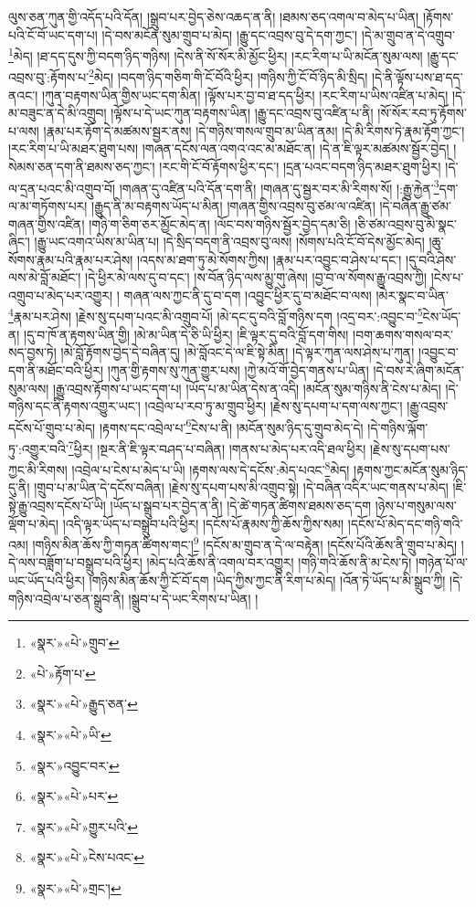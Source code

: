 ལུས་ཅན་ཀུན་གྱི་འདོད་པའི་དོན། །སྒྲུབ་པར་བྱེད་ཅེས་འཆད་ན་ནི། །ཐམས་ཅད་འགལ་བ་མེད་པ་ཡིན། །རྟོགས་པའི་ངོ་བོ་ཡང་དག་པ། །དེ་བས་མངོན་སུམ་གྲུབ་པ་མེད། །རྒྱུ་དང་འབྲས་བུ་དེ་དག་ཀྱང་། །དེ་མ་གྲུབ་ན་དེ་འགྲུབ་\footnote{«སྣར་»«པེ་»གྲུབ་}མེད། །ཐ་དད་དུས་ཀྱི་བདག་ཉིད་གཉིས། །དེས་ནི་སོ་སོར་མི་མྱོང་ཕྱིར། །རང་རིག་པ་ཡི་མངོན་སུམ་ལས། །རྒྱུ་དང་འབྲས་བུ་:རྟོགས་པ་\footnote{«པེ་»རྟོག་པ་}མེད། །བདག་ཉིད་གཅིག་གི་ངོ་བོའི་ཕྱིར། །གཉིས་ཀྱི་ངོ་བོ་ཉིད་མི་སྲིད། །དེ་ནི་ལྟོས་པས་ཐ་དད་ནའང་། །ཀུན་བརྟགས་ཡིན་གྱིས་ཡང་དག་མིན། །ལྟོས་པར་བྱ་བ་ཐ་དད་ཕྱིར། །རང་རིག་པ་ཡིས་འཛིན་པ་མེད། །དེ་མ་བཟུང་ན་དེ་མི་འགྲུབ། །ལྟོས་པ་དེ་ཡང་ཀུན་བརྟགས་ཡིན། །རྒྱུ་དང་འབྲས་བུ་འཛིན་པ་ནི། །སོ་སོར་རབ་ཏུ་རྟོགས་པ་ལས། །རྣམ་པར་རྟོག་དེ་མཚམས་སྦྱར་ནས། །དེ་གཉིས་གསལ་གྲུབ་མ་ཡིན་ནམ། །དེ་མི་རིགས་ཏེ་རྣམ་རྟོག་ཀྱང་། །རང་རིག་པ་ཡི་མཐར་ཐུག་པས། །གཞན་དངོས་ལན་འགའ་འང་མ་མཐོང་ན། །དེ་ན་ཇི་ལྟར་མཚམས་སྦྱོར་བྱེད། །སེམས་ཅན་དག་ནི་ཐམས་ཅད་ཀྱང་། །རང་གི་ངོ་བོ་རྟོགས་ཕྱིར་དང་། །དྲན་པའང་བདག་ཉིད་མཐར་ཐུག་ཕྱིར། །དེ་ལ་དྲན་པའང་མི་འགྲུབ་བོ། །གཞན་དུ་འཛིན་པའི་དོན་དག་ནི། །གཞན་དུ་སྦྱར་བར་མི་རིགས་སོ། །:རྒྱུ་རྐྱེན་\footnote{«སྣར་»«པེ་»རྒྱུད་ཅན་}དག་ལ་མ་གཏོགས་པར། །རྒྱུད་ནི་མ་བརྟགས་ཡོད་པ་མིན། །གཞན་གྱིས་འབྲས་བུ་ཙམ་ལ་འཛིན། །དེ་བཞིན་རྒྱུ་ཙམ་གཞན་གྱིས་འཛིན། །གཉི་ག་ཅིག་ཅར་མྱོང་མེད་ན། །ལོང་བས་གཉིས་སྦྱོར་བྱེད་དམ་ཅི། །ཅི་ཙམ་འབྲས་བུ་མི་སྣང་ཞིང་། །རྒྱུ་ཡང་འགའ་ཡིས་མ་ཡིན་པ། །དེ་སྲིད་བདག་ནི་འབྲས་བུ་ལས། །སོགས་པའི་ངོ་བོ་དེས་མྱོང་མེད། །ཆུ་སོགས་རྣམ་པའི་རྣམ་པར་ཤེས། །འདས་མ་ཐག་ཏུ་མེ་སོགས་ཀྱིས། །རྣམ་པར་འབྱུང་བ་ཤེས་པ་དང་། །དུ་བའི་ཤེས་ལས་མེ་བློ་མཐོང་། །དེ་ཕྱིར་མེ་ལས་དུ་བ་དང་། །ས་བོན་ཉིད་ལས་མྱུ་གུ་ཞེས། །བྱ་བ་ལ་སོགས་རྒྱུ་འབྲས་ཀྱི། །ངེས་པ་འགྲུབ་པ་མེད་པར་འགྱུར། །
གཞན་ལས་ཀྱང་ནི་དུ་བ་དག །འབྱུང་ཕྱིར་དུ་བ་མཐོང་བ་ལས། །མེར་སྣང་བ་ཡིན་\footnote{«སྣར་»«པེ་»ཡི་}རྣམ་པར་ཤེས། །རྗེས་སུ་དཔག་པའང་མི་འགྲུབ་པོ། །མེ་དང་དུ་བའི་བློ་གཉིས་དག །འདྲ་བར་:འབྱུང་བ་\footnote{«སྣར་»འབྱུང་བར་}ངེས་ཡོད་ན། །དུ་བ་ཁོ་ན་རྟགས་ཡིན་གྱི། །མེ་མ་ཡིན་དེ་ཅི་ཡི་ཕྱིར། །ཇི་ལྟར་དུ་བའི་བློ་དག་གིས། །བག་ཆགས་གསལ་བར་སད་བྱས་ཏེ། །མེ་བློ་རྟོགས་བྱེད་དེ་བཞིན་དུ། །མེ་བློའང་དེ་ལ་ཇི་སྟེ་མིན། །དེ་ལྟར་ཀུན་ལས་ཤེས་པ་ཀུན། །འབྱུང་བ་དག་ནི་མཐོང་བའི་ཕྱིར། །ཀུན་གྱི་རྟགས་སུ་ཀུན་གྱུར་པས། །ཀྱེ་མའོ་གོ་བྱེད་གནས་པ་ཡིན། །དེ་བས་རེ་ཞིག་མངོན་སུམ་ལས། །རྒྱུ་འབྲས་རྟོགས་པ་ཡང་དག་པ། །ཡོད་པ་མ་ཡིན་དེས་ན་འདི། །མངོན་སུམ་གཉིས་ནི་ངེས་པ་མེད། །དེ་གཉིས་དང་ནི་རྟགས་འགྱུར་ཡང་། །འབྲེལ་པ་རབ་ཏུ་མ་གྲུབ་ཕྱིར། །རྗེས་སུ་དཔག་པ་དག་ལས་ཀྱང་། །རྒྱུ་འབྲས་དངོས་པོ་གྲུབ་པ་མེད། །རྟགས་དང་འབྲེལ་པ་\footnote{«སྣར་»«པེ་»པར་}ངེས་པ་ནི། །མངོན་སུམ་ཉིད་དུ་གྲུབ་མེད་དེ། །དེ་གཉིས་ལྐོག་ཏུ་:འགྱུར་བའི་\footnote{«སྣར་»«པེ་»གྱུར་པའི་}ཕྱིར། །སྔར་ནི་ཇི་ལྟར་བཤད་པ་བཞིན། །གནས་པ་མེད་པར་འདི་ཐལ་ཕྱིར། །རྗེས་སུ་དཔག་པས་ཀྱང་མི་རིགས། །འབྲེལ་པ་ངེས་པ་མེད་པ་ཡི། །རྟགས་ལས་དེ་དངོས་:མེད་པའང་\footnote{«སྣར་»«པེ་»ངེས་པའང་}མེད། །རྟགས་ཀྱང་མངོན་སུམ་ཉིད་དུ་ནི། །གྲུབ་པ་མ་ཡིན་དེ་དངོས་བཞིན། །རྗེས་སུ་དཔག་པས་མི་འགྲུབ་སྟེ། །དེ་བཞིན་འདིར་ཡང་གནས་པ་མེད། །ཇི་སྟེ་རྒྱུ་འབྲས་དངོས་པོ་ཡི། །ཡོད་པ་སྒྲུབ་པར་བྱེད་ན་ནི། །དེ་ཚེ་གཏན་ཚིགས་ཐམས་ཅད་དག །ཉེས་པ་གསུམ་ལས་ལྡོག་པ་མེད། །འདི་ལྟར་ཡོད་པ་བསྒྲུབ་པའི་ཕྱིར། །དངོས་པོ་རྣམས་ཀྱི་ཆོས་ཀྱིས་སམ། །དངོས་པོ་མེད་དང་གཉི་གའི་འམ། །གཉིས་མིན་ཆོས་ཀྱི་གཏན་ཚིགས་གང་།\footnote{«སྣར་»«པེ་»གྲང་།} །དངོས་མ་གྲུབ་ན་དེ་ལ་བརྟེན། །དངོས་པོའི་ཆོས་ནི་གྲུབ་པ་མེད། །དེ་ལས་བཟློག་པ་བསྒྲུབ་པའི་ཕྱིར། །མེད་པའི་ཆོས་ནི་འགལ་བར་འགྱུར། །གཉི་གའི་ཆོས་ནི་མ་ངེས་ཏེ། །གཉེན་པོ་ལ་ཡང་ཡོད་པའི་ཕྱིར། །གཉིས་མིན་ཆོས་ཀྱི་ངོ་བོ་དག །ཡིད་ཀྱིས་ཀྱང་ནི་རིག་པ་མེད། །འོན་ཏེ་ཡོད་པ་མི་སྒྲུབ་ཀྱི། །དེ་གཉིས་འབྲེལ་པ་ཅན་སྒྲུབ་ནི། །སྒྲུབ་པ་དེ་ཡང་རིགས་པ་ཡིན། །
